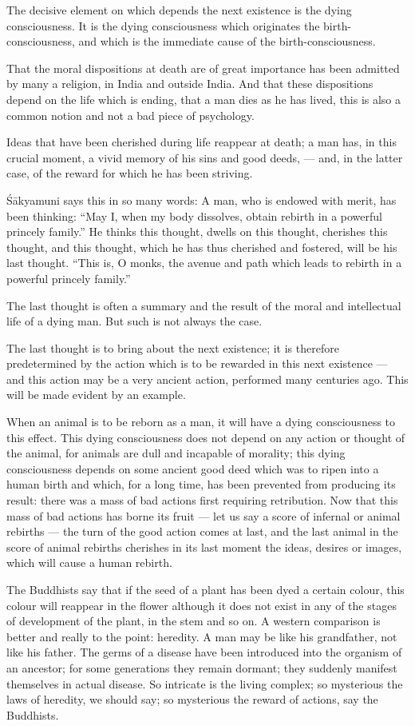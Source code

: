 \documentclass[a4paper, 11pt, oneside, english, landscape]{article}
\begin{document}
The decisive element on which depends the next existence is the dying consciousness. It is the dying consciousness which originates the birth-consciousness, and which is the immediate cause of the birth-consciousness.

That the moral dispositions at death are of great importance has been admitted by many a religion, in India and outside India. And that these dispositions depend on the life which is ending, that a man dies as he has lived, this is also a common notion and not a bad piece of psychology.

Ideas that have been cherished during life reappear at death; a man has, in this crucial moment, a vivid memory of his sins and good deeds, --- and, in the latter case, of the reward for which he has been striving.

Śākyamuni says this in so many words: A man, who is endowed with merit, has been thinking: ``May I, when my body dissolves, obtain rebirth in a powerful princely family.'' He thinks this thought, dwells on this thought, cherishes this thought, and this thought, which he has thus cherished and fostered, will be his last thought. ``This is, O monks, the avenue and path which leads to rebirth in a powerful princely family.''

The last thought is often a summary and the result of the moral and intellectual life of a dying man. But such is not always the case.

The last thought is to bring about the next existence; it is therefore predetermined by the action which is to be rewarded in this next existence --- and this action may be a very ancient action, performed many centuries ago. This will be made evident by an example.

When an animal is to be reborn as a man, it will have a dying consciousness to this effect. This dying consciousness does not depend on any action or thought of the animal, for animals are dull and incapable of morality; this dying consciousness depends on some ancient good deed which was to ripen into a human birth and which, for a long time, has been prevented from producing its result: there was a mass of bad actions first requiring retribution. Now that this mass of bad actions has borne its fruit --- let us say a score of infernal or animal rebirths --- the turn of the good action comes at last, and the last animal in the score of animal rebirths cherishes in its last moment the ideas, desires or images, which will cause a human rebirth.

The Buddhists say that if the seed of a plant has been dyed a certain colour, this colour will reappear in the flower although it does not exist in any of the stages of development of the plant, in the stem and so on. A western comparison is better and really to the point: heredity. A man may be like his grandfather, not like his father. The germs of a disease have been introduced into the organism of an ancestor; for some generations they remain dormant; they suddenly manifest themselves in actual disease. So intricate is the living complex; so mysterious the laws of heredity, we should say; so mysterious the reward of actions, say the Buddhists.
\end{document}
